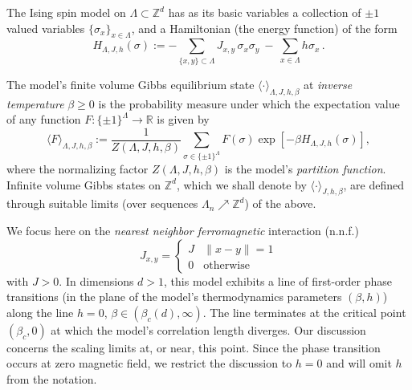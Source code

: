 \documentclass[a4paper,oneside,11pt]{article}
\def\Z{\mathbb{Z}}                          %
\def\R{\mathbb{R}}
\newcommand{\be}[1]{\begin{equation}\label{#1}}
\newcommand{\ee}{\end{equation}}
\numberwithin{equation}{section}
\numberwithin{equation}{section}
\numberwithin{equation}{section}
\def\Z{\mathbb{Z}}                          %
\def\be{\begin{equation}}
\def\ee{\end{equation}}
\begin{document}
The Ising  spin model on $\Lambda \subset \Z^d$ has as its basic variables a collection of $\pm 1$ valued variables $\{\sigma_x\}_{x\in \Lambda}$, and a Hamiltonian (the energy function)  of the form
\be \label{Ising_H}
H_{\Lambda,J,h}(\sigma):=-\sum_{\{x,y\}\subset \Lambda}J_{x,y}\,\sigma_x\sigma_y \  - \  \sum_{x\in \Lambda} h \sigma_x \, .   
\ee 

The model's finite volume Gibbs equilibrium state $\langle \cdot\rangle_{\Lambda,J,h,\beta}$ at {\em inverse temperature} $\beta\ge0$ is the probability measure under which the expectation value of any function  $F:\{\pm1\}^\Lambda\rightarrow \R$ is  given by
\begin{equation}
\label{eq:Gibbs}
\langle F\rangle_{\Lambda,J,h,\beta}:=\frac{1}{Z(\Lambda,J,h,\beta)}\sum_{\sigma\in\{\pm1\}^\Lambda}F(\sigma)\exp[-\beta H_{\Lambda,J,h}(\sigma)],  \end{equation}
where the normalizing factor $Z(\Lambda,J,h,\beta)$ is the model's {\em partition function}. 
Infinite volume Gibbs states on $\Z^d$, which we shall denote by $\langle\cdot\rangle_{J,h,\beta}$,  are defined through suitable limits (over  sequences $\Lambda_n \nearrow \Z^d$) of the above.   


We focus here on the {\em  nearest neighbor ferromagnetic} interaction (n.n.f.) 
\be
J_{x,y}   = \begin{cases}   J & \|x-y\| =1 \\  
0 & \mbox{otherwise} 
\end{cases}
\ee 
 with $J>0$.  In dimensions $d>1$, this model exhibits a line of first-order phase transitions (in the  plane of the model's thermodynamics parameters $(\beta,h)$) along the line $h=0$, $\beta \in (\beta_c(d),\infty)$.   The line terminates at the critical point 
 $(\beta_c,0)$ at which the model's correlation length diverges.   Our discussion concerns the scaling limits at, or near, this point.   Since the phase transition occurs at zero magnetic field, we restrict the discussion to $h=0$ and will omit $h$ from the notation.  


\end{document}
